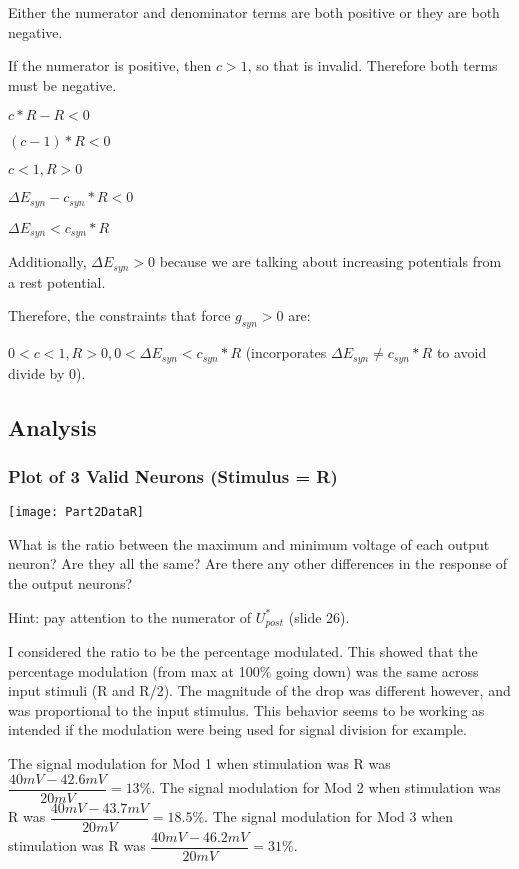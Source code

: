 \documentclass[12pt, letterpaper, oneside, notitlepage, onecolumn]{article}
\begin{document}
Either the numerator and denominator terms are both positive or they are both negative.

If the numerator is positive, then $c > 1$, so that is invalid. Therefore both terms must be negative.

$c*R - R < 0$

$(c - 1) * R < 0$

$c < 1, R > 0$

$\Delta E_{syn} - c_{syn} * R < 0$

$\Delta E_{syn} < c_{syn} * R$

Additionally, $\Delta E_{syn} > 0$ because we are talking about increasing potentials from a rest potential.

Therefore, the constraints that force $g_{syn} >0$ are:

$0 < c < 1, R > 0, 0 < \Delta E_{syn} < c_{syn} * R$ (incorporates $\Delta E_{syn} \neq c_{syn} * R$ to avoid divide by 0).

\subsection{Analysis}

\subsubsection{Plot of 3 Valid Neurons (Stimulus = R)}

\texttt{[image: Part2DataR]}

What is the ratio between the maximum and minimum voltage of each output
neuron? Are they all the same? Are there any other differences in the response
of the output neurons?

Hint: pay attention to the numerator of $U^{*}_{post}$ (slide 26).

I considered the ratio to be the percentage modulated. This showed that the percentage modulation (from max at 100\% going down) was the same across input stimuli (R and R/2). The magnitude of the drop was different however, and was proportional to the input stimulus. This behavior seems to be working as intended if the modulation were being used for signal division for example.

The signal modulation for Mod 1 when stimulation was R was $\dfrac{40 mV - 42.6 mV}{20 mV} = 13\%$.
The signal modulation for Mod 2 when stimulation was R was $\dfrac{40 mV - 43.7 mV}{20 mV} = 18.5\%$.
The signal modulation for Mod 3 when stimulation was R was $\dfrac{40 mV - 46.2 mV}{20 mV} = 31\%$.
\end{document}
